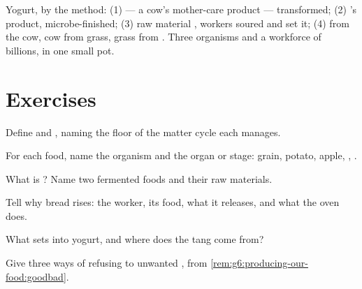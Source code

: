 \begin{example}\label{ex:g6:producing-our-food:breakfast}
Yogurt, by the method: (1)  --- a cow's mother-care
product --- transformed; (2) 's product,
microbe-finished; (3) raw material , workers soured and
set it; (4)  from the cow, cow from grass, grass from
. Three organisms and a workforce of billions, in one
small pot.
\end{example}

\section{Exercises}

\begin{exercise}[$\star$]\label{exo:g6:producing-our-food:1}
Define  and , naming the floor
of the matter cycle each manages.
\end{exercise}

\begin{exercise}[$\star$]\label{exo:g6:producing-our-food:2}
For each food, name the organism and the organ or stage:
grain, potato, apple, , .
\end{exercise}

\begin{exercise}[$\star$]\label{exo:g6:producing-our-food:3}
What is ? Name two fermented foods and their
raw materials.
\end{exercise}

\begin{exercise}[$\star$]\label{exo:g6:producing-our-food:4}
Tell why bread rises: the worker, its food, what it
releases, and what the oven does.
\end{exercise}

\begin{exercise}[$\star$]\label{exo:g6:producing-our-food:5}
What sets  into yogurt, and where does the tang come
from?
\end{exercise}

\begin{exercise}[$\star$]\label{exo:g6:producing-our-food:6}
Give three ways of refusing  to unwanted
, from \cref{rem:g6:producing-our-food:goodbad}.
\end{exercise}

